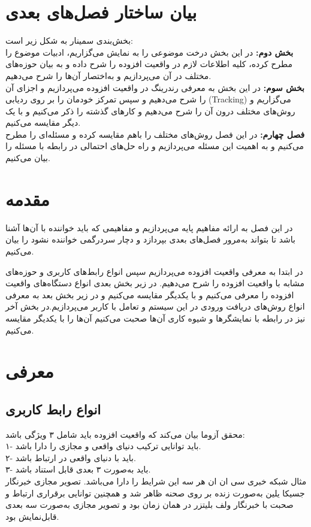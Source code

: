 \section{بیان ساختار فصل‌های بعدی}
بخش‌بندی سمینار به شکل زیر است:
\\
\textbf{
	بخش دوم:} در این بخش درخت موضوعی را به نمایش می‌گزاریم، ادبیات موضوع را مطرح کرده، کلیه اطلاعات لازم در واقعیت افزوده را شرح داده و به بیان حوزه‌های مختلف در آن می‌پردازیم و به‌اختصار آن‌ها را شرح می‌دهیم.
\\
\textbf{
	بخش سوم: } در این بخش به معرفی رندرینگ در واقعیت افزوده می‌پردازیم و اجزای آن را شرح می‌دهیم و سپس تمرکز خودمان را بر روی ردیابی (Tracking) می‌گزاریم و روش‌های مختلف درون آن را شرح می‌دهیم و کارهای گذشته را ذکر می‌کنیم و با یک دیگر مقایسه می‌کنیم.
\\
\textbf{
	فصل چهارم:} در این فصل روش‌های مختلف را باهم مقایسه کرده و مسئله‌ای را مطرح می‌کنیم و به اهمیت این مسئله می‌پردازیم و راه حل‌های احتمالی در رابطه با مسئله را بیان می‌کنیم.


\section{مقدمه}
در این فصل به ارائه مفاهیم پایه می‌پردازیم و مفاهیمی که  باید خواننده با آن‌ها آشنا باشد تا بتواند به‌مرور فصل‌های بعدی بپردازد و دچار سردرگمی خواننده نشود را بیان می‌کنیم.

در ابتدا به معرفی واقعیت افزوده می‌پردازیم سپس انواع رابط‌های کاربری و حوزه‌های مشابه با واقعیت افزوده را شرح می‌دهیم. در زیر بخش بعدی انواع دستگاه‌های واقعیت افزوده را معرفی می‌کنیم و با یکدیگر مقایسه می‌کنیم و در زیر بخش بعد به معرفی انواع روش‌های دریافت ورودی در این سیستم و تعامل با کاربر می‌پردازیم.در بخش آخر نیز در رابطه با نمایشگرها و شیوه کاری آن‌ها صحبت می‌کنیم آن‌ها را با یکدیگر مقایسه می‌کنیم.
\section{معرفی}
\subsection{انواع رابط کاربری}
\noindent
محقق آزوما بیان می‌کند که واقعیت افزوده باید شامل ۳ ویژگی باشد\cite{Azuma}:
\\
۱- باید توانایی ترکیب دنیای واقعی و مجازی را دارا باشد.
\\
۲- باید با دنیای واقعی در ارتباط باشد.
\\
۳- باید به‌صورت ۳ بعدی قابل استناد باشد.
\\
مثال شبکه خبری سی ان ان هر سه این شرایط را دارا می‌باشد. تصویر مجازی خبرنگار جسیکا یلین به‌صورت زنده بر روی صحنه ظاهر شد و همچنین توانایی برقراری ارتباط و صحبت با خبرنگار ولف بلیتزر در همان زمان بود و تصویر مجازی به‌صورت سه بعدی قابل‌نمایش بود.

